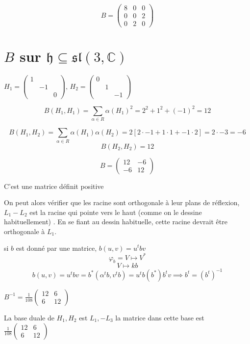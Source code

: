 \[ B = \begin{pmatrix} 8 &0 &0 \\ 0&0&2 \\ 0 &2&0 \end{pmatrix}  \]
\section*{\(B\) sur \(\mathfrak{h} \subseteq \mathfrak{sl}(3, \mathds{C})\)}

\(H_1 = \begin{pmatrix} 1 \\ & -1 \\&&0 \end{pmatrix},\, H_2 = \begin{pmatrix} 0 \\ & 1 \\ && -1 \end{pmatrix}  \)

\[ B(H_1, H_1 ) = \sum_{\alpha \in R} \alpha (H_1)^{2} = 2^2 + 1^2 + (-1)^{2}= 12 \]

\[ B(H_1, H_2 ) = \sum_{\alpha\in R} \alpha (H_1) \alpha (H_2 ) = 2 \left[ 2 \cdot -1 + 1 \cdot 1 + -1 \cdot 2\right] =2 \cdot -3 = -6  \]
\[ B(H_2, H_2 ) =12 \]

\[ B = \begin{pmatrix} 12 & -6 \\ -6 & 12  \end{pmatrix}  \]

C'est une matrice définit positive


On peut alors vérifier que les racine sont orthogonale à leur plans de réflexion, \(L_1 - L_2\) est la racine qui pointe vers le haut (comme on le dessine habituellement) . En se fiant au dessin habituelle, cette racine devrait être orthogonale à \(L_1\).

\begin{tcolorbox}[title=Rappel d'algèbre linéaire ]
	si \(b\) est donné par une matrice, \(b(u,v) = u^{t}b v \)
	\[ \varphi_b = V \mapsto V ^{*} \]
	\[ V \mapsto k b\]
	\[ b(u,v) = u^{t}b v = b^{*} (\alpha ^{t} b , v^t b) = u^{t}b (b^{*}) b^{t}v \implies b^{t}= (b^t) ^{-1}\]
\end{tcolorbox}

\(B^{-1} = \frac{1}{108} \begin{pmatrix} 12 & 6 \\ 6 & 12 \end{pmatrix} \)

La base duale de \(H_1, H_2\) est \(L_1 , - L_3\)
la matrice dans cette base est \(\frac{1}{108} \begin{pmatrix} 12 &6 \\ 6 & 12  \end{pmatrix} \)

